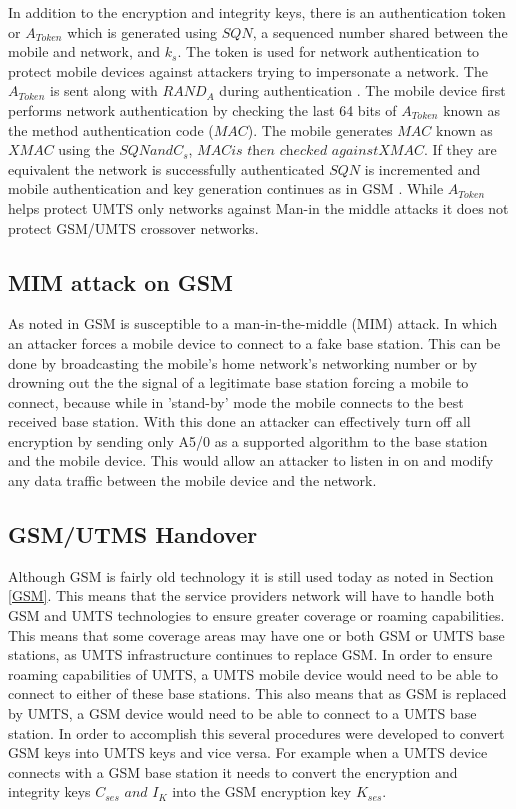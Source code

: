 \documentclass{sig-alternate}
\begin{document}
		 In addition to the encryption and integrity keys, there is an authentication token or $\mathit{A_{Token}}$ which is generated using $\mathit{SQN}$, a sequenced number shared between the mobile and network, and $k_{s}$. The token is used for network authentication to protect mobile devices against attackers trying to impersonate a network. The $A_{Token}$ is sent along with $\mathit{RAND_{A}}$ during authentication \cite{Meyer:2004}. The mobile device first performs network authentication by checking the last 64 bits of $\mathit{A_{Token}}$ known as the method authentication code ($\mathit{MAC}$). The mobile generates $\mathit{MAC}$ known as $\mathit{XMAC}$ using the $\mathit{SQN and C_{s}}$, $\mathit{MAC \text{is then checked against} XMAC}$. If they are equivalent the network is successfully authenticated $\mathit{SQN}$ is incremented and mobile authentication and key generation continues as in GSM \cite{security-mech}. While $\mathit{A_{Token}}$ helps protect UMTS only networks against Man-in the middle attacks it does not protect GSM/UMTS crossover networks. 
  
	\subsection{MIM attack on GSM}
	As noted in \cite{Meyer:2004} GSM is susceptible to a man-in-the-middle (MIM) attack. In which an attacker forces a mobile device to connect to a fake base station. This can  be done by broadcasting the mobile's home network's networking number or by drowning out the the signal of a legitimate base station forcing   a mobile to connect, because while in 'stand-by' mode  the mobile connects to the best received base station. With this done an attacker can effectively turn off all encryption by sending only A5/0 as a supported algorithm to the base station and the mobile device. This would allow an attacker to listen in on and modify any data traffic between the mobile device and the network.
	\subsection{GSM/UTMS Handover \label{Handover}}
	Although GSM is fairly old technology it is still used today as noted in Section \ref{GSM}. This means that the service providers network will have to handle both GSM and UMTS technologies to ensure greater coverage or roaming capabilities. This means that some coverage areas may have one or both GSM or UMTS base stations, as UMTS infrastructure continues to replace GSM. In order to ensure roaming capabilities of UMTS, a UMTS mobile device would need to be able to connect to either of these base stations. This also means that as GSM is replaced by UMTS, a GSM device would need to be able to connect to a UMTS base station. In order to accomplish this several procedures were developed to convert GSM keys into UMTS keys and vice versa. For example when a UMTS device connects with a GSM base station it needs to convert the encryption and integrity keys $\mathit{C_{ses}\text{ and } I_{K}}$ into the GSM encryption key $K_{ses}$.   
	
\end{document}
